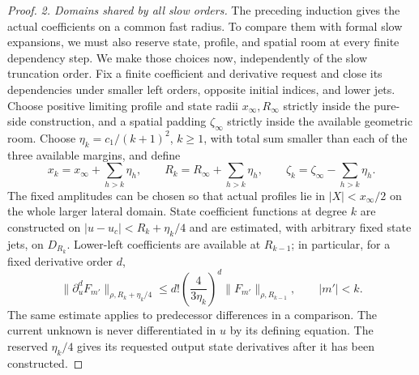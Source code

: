 \begin{proof}
\emph{2. Domains shared by all slow orders.}
The preceding induction gives the actual coefficients on a common fast
radius.  To compare them with formal slow expansions, we must also reserve
state, profile, and spatial room at every finite dependency step.  We make
those choices now, independently of the slow truncation order.  Fix a
finite coefficient and derivative request and close its dependencies
under smaller left orders, opposite initial indices, and lower jets.
Choose positive limiting profile and state radii $x_\infty,R_\infty$
strictly inside the pure-side construction, and a spatial padding
$\zeta_\infty$ strictly inside the available geometric room.  Choose
$\eta_k=c_1/(k+1)^2$, $k\ge1$, with total sum smaller than each of the
three available margins, and define
\begin{equation}\label{eq:additive-reservoirs}
 x_k=x_\infty+\sum_{h>k}\eta_h,\qquad
 R_k=R_\infty+\sum_{h>k}\eta_h,\qquad
 \zeta_k=\zeta_\infty-\sum_{h>k}\eta_h.
\end{equation}
The fixed amplitudes can be chosen so that actual profiles lie in
$|X|<x_\infty/2$ on the whole larger lateral domain.  State coefficient
functions at degree $k$ are constructed on
$|u-u_c|<R_k+\eta_k/4$ and are estimated, with arbitrary fixed state
jets, on $D_{R_k}$.  Lower-left coefficients are available at $R_{k-1}$;
in particular, for a fixed derivative order $d$,
\begin{equation}\label{eq:additive-inherited-Cauchy}
 \|\partial_u^d F_{m'}\|_{\rho,R_k+\eta_k/4}
 \le d!\left(\frac{4}{3\eta_k}\right)^d
             \|F_{m'}\|_{\rho,R_{k-1}},\qquad |m'|<k.
\end{equation}
The same estimate applies to predecessor differences in a comparison.
The current unknown is never differentiated in $u$ by its defining
equation.  The reserved $\eta_k/4$ gives its requested output state
derivatives after it has been constructed.


\end{proof}
